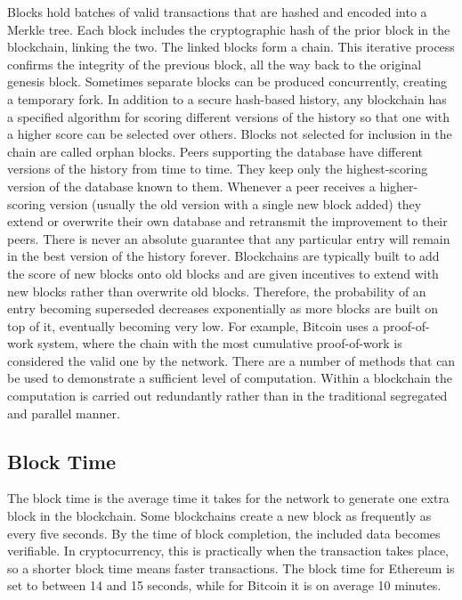 Blocks hold batches of valid transactions that are hashed and encoded into a
Merkle tree. Each block includes the cryptographic hash of the prior block in
the blockchain, linking the two. The linked blocks form a chain. This iterative
process confirms the integrity of the previous block, all the way back to the
original genesis block. Sometimes separate blocks can be produced concurrently,
creating a temporary fork. In addition to a secure hash-based history, any
blockchain has a specified algorithm for scoring different versions of the
history so that one with a higher score can be selected over others. Blocks not
selected for inclusion in the chain are called orphan blocks. Peers supporting
the database have different versions of the history from time to time. They
keep only the highest-scoring version of the database known to them. Whenever a
peer receives a higher-scoring version (usually the old version with a single
new block added) they extend or overwrite their own database and retransmit the
improvement to their peers. There is never an absolute guarantee that any
particular entry will remain in the best version of the history forever.
Blockchains are typically built to add the score of new blocks onto old blocks
and are given incentives to extend with new blocks rather than overwrite old
blocks. Therefore, the probability of an entry becoming superseded decreases
exponentially as more blocks are built on top of it, eventually becoming very
low. For example, Bitcoin uses a proof-of-work system, where the chain with the
most cumulative proof-of-work is considered the valid one by the network. There
are a number of methods that can be used to demonstrate a sufficient level of
computation. Within a blockchain the computation is carried out redundantly
rather than in the traditional segregated and parallel manner.

\subsection{Block Time}

The block time is the average time it takes for the network to generate one
extra block in the blockchain. Some blockchains create a new block as
frequently as every five seconds. By the time of block completion, the included
data becomes verifiable. In cryptocurrency, this is practically when the
transaction takes place, so a shorter block time means faster transactions. The
block time for Ethereum is set to between 14 and 15 seconds, while for Bitcoin
it is on average 10 minutes.

